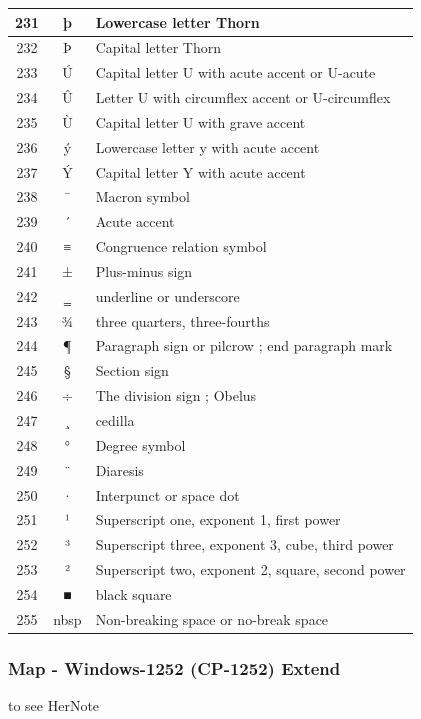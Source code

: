 {\begin{longtable}{|c|c|l|}
\hline
231 & þ & Lowercase letter Thorn \\
\hline
232 & Þ & Capital letter Thorn \\
\hline
233 & Ú & Capital letter U with acute accent or U-acute \\
\hline
234 & Û & Letter U with circumflex accent or U-circumflex \\
\hline
235 & Ù & Capital letter U with grave accent \\
\hline
236 & ý & Lowercase letter y with acute accent \\
\hline
237 & Ý & Capital letter Y with acute accent \\
\hline
238 & ¯ & Macron symbol \\
\hline
239 & ´ & Acute accent \\
\hline
240 & ≡ & Congruence relation symbol \\
\hline
241 & ± & Plus-minus sign \\
\hline
242 & ‗ & underline or underscore \\
\hline
243 & ¾ & three quarters, three-fourths \\
\hline
244 & ¶ & Paragraph sign or pilcrow ; end paragraph mark \\
\hline
245 & § & Section sign \\
\hline
246 & ÷ & The division sign ; Obelus \\
\hline
247 & ¸ & cedilla \\
\hline
248 & ° & Degree symbol \\
\hline
249 & ¨ & Diaresis \\
\hline
250 & · & Interpunct or space dot \\
\hline
251 & ¹ & Superscript one, exponent 1, first power \\
\hline
252 & ³ & Superscript three, exponent 3, cube, third power \\
\hline
253 & ² & Superscript two, exponent 2, square, second power \\
\hline
254 & ■ & black square \\
\hline
255 & nbsp & Non-breaking space or no-break space \\
\hline

\end{longtable}

}



\subsubsection{Map - Windows-1252 (CP-1252) Extend}

to see HerNote

